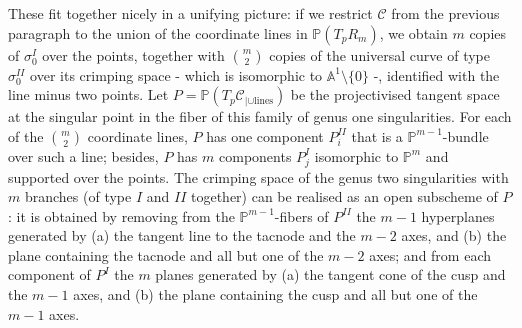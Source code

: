 \documentclass[11pt]{amsart}
\newcommand{\PP}{\mathbb P}
\newcommand{\Aaff}{\mathbb A}
\theoremstyle{plain}
\theoremstyle{definition}
\begin{document}
These fit together nicely in a unifying picture: if we restrict $\mathcal C$ from the previous paragraph to the union of the coordinate lines in $\PP(T_pR_m)$, we obtain $m$ copies of $\sigma_0^{I}$ over the points, together with $\binom{m}{2}$ copies of the universal curve of type $\sigma_0^{I\!I}$ over its crimping space - which is isomorphic to $\Aaff^1\setminus\{0\}$ -, identified with the line minus two points. Let $P=\PP(T_p\mathcal C_{|\cup\text{lines}})$ be the projectivised tangent space at the singular point in the fiber of this family of genus one singularities. For each of the $\binom{m}{2}$ coordinate lines, $P$ has one component $P^{I\!I}_i$ that is a $\PP^{m-1}$-bundle over such a line; besides, $P$ has $m$ components $P^{I}_j$ isomorphic to $\PP^m$ and supported over the points. The crimping space of the genus two singularities with $m$ branches (of type $I$ and $I\!I$ together) can be realised as an open subscheme of $P$: it is obtained by removing from the $\PP^{m-1}$-fibers of $P^{I\!I}$ the $m-1$ hyperplanes generated by (a) the tangent line to the tacnode and the $m-2$ axes, and (b) the plane containing the tacnode and all but one of the $m-2$ axes; and from each component of $P^{I}$ the $m$ planes generated by (a) the tangent cone of the cusp and the $m-1$ axes, and (b) the plane containing the cusp and all but one of the $m-1$ axes.
\end{document}
